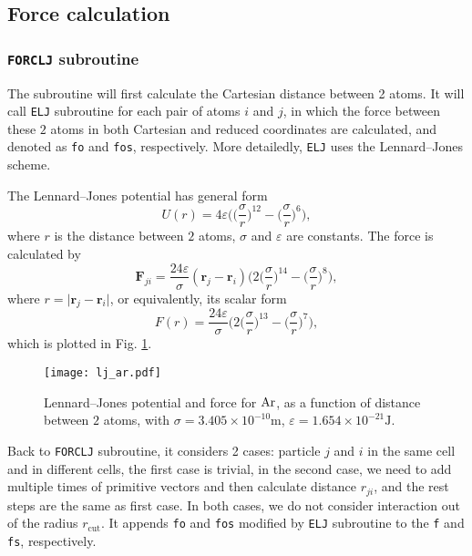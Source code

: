 
\subsection{Force calculation}
\subsubsection{\texttt{FORCLJ} subroutine}
\label{sssec:forclj}

The subroutine will first calculate the Cartesian distance between 2 atoms.
It will call \texttt{ELJ} subroutine for each pair of atoms $i$ and $j$, in which
the force between these $2$ atoms in both Cartesian and reduced coordinates
are calculated, and denoted as \texttt{fo} and \texttt{fos}, respectively.
More detailedly, \texttt{ELJ} uses the Lennard--Jones scheme.

The Lennard--Jones potential has general form
\begin{equation}
	U(r) = 4\varepsilon \bigg( \Big( \frac{ \sigma }{ r } \Big) ^ {12} -
	\Big( \frac{ \sigma }{ r } \Big) ^ 6 \bigg),
\end{equation}
where $r$ is the distance between $2$ atoms, $\sigma$ and $\varepsilon$
are constants.
The force is calculated by
\begin{equation}
	\bm{F}_{ji} = \frac{ 24\varepsilon }{ \sigma } (\bm{r}_j - \bm{r}_i)
	\bigg( 2\Big( \frac{ \sigma }{ r } \Big) ^ {14} -
	\Big( \frac{ \sigma }{ r } \Big) ^ 8 \bigg),
\end{equation}
where $r = \lvert \bm{r}_j - \bm{r}_i \rvert$, or equivalently, its scalar form
\begin{equation}
	F(r) = \frac{ 24\varepsilon }{ \sigma }
	\bigg( 2\Big( \frac{ \sigma }{ r } \Big) ^ {13} -
	\Big( \frac{ \sigma }{ r } \Big) ^ 7 \bigg),
\end{equation}
which is plotted in Fig. \ref{fig:ljar}.

\begin{figure}[h]
	\centering
	\texttt{[image: lj\_ar.pdf]}
	\caption{Lennard--Jones potential and force for $\ce{Ar}$, as a function of
		distance between $2$ atoms, with
		$\sigma=3.405\times 10^{-10}\si{\meter}$,
		$\varepsilon = 1.654\times 10^{-21}\si{\joule}$.\cite{buffalomd}}
	\label{fig:ljar}
\end{figure}

Back to \texttt{FORCLJ} subroutine,
it considers 2 cases: particle $j$ and $i$ in the same cell and
in different cells, the first case is trivial, in the second case,
we need to add multiple times of primitive vectors and then calculate distance
$r_{ji}$, and the rest steps are the same as first case. In both cases, we do not
consider interaction out of the radius $r_{\text{cut}}$.
It appends \texttt{fo} and \texttt{fos} modified by \texttt{ELJ}
subroutine to the \texttt{f} and \texttt{fs}, respectively.


